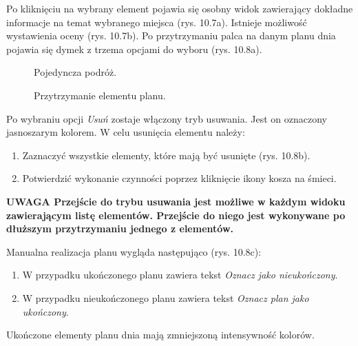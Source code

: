 \par Po kliknięciu na wybrany element pojawia się osobny widok zawierający dokładne informacje na temat wybranego miejsca (rys. 10.7a). Istnieje możliwość wystawienia oceny (rys. 10.7b).
Po przytrzymaniu palca na danym planu dnia pojawia się dymek z trzema opcjami do wyboru (rys. 10.8a).

\begin{figure}[h]

\centering
\null\hfill
{}
\hfill
{}
\hfill\null

\caption{Pojedyncza podróż.}
\label{fig:podrecznik4}
\end{figure}
\FloatBarrier

\begin{figure}[h]

\centering
\null\hfill
{}
\hfill
{}
\hfill
{}
\hfill\null

\caption{Przytrzymanie elementu planu.}
\label{fig:podrecznik5}
\end{figure}
\FloatBarrier


Po wybraniu opcji \textit{Usuń} zostaje włączony tryb usuwania.
Jest on oznaczony jasnoszarym kolorem.
W celu usunięcia elementu należy:
\begin{enumerate}
\item Zaznaczyć wszystkie elementy, które mają być usunięte (rys. 10.8b).
\item Potwierdzić wykonanie czynności poprzez kliknięcie ikony kosza na śmieci.
\end{enumerate}
\textbf{UWAGA Przejście do trybu usuwania jest możliwe w każdym widoku zawierającym listę elementów. Przejście do niego jest wykonywane po dłuższym przytrzymaniu jednego z elementów.}



\par Manualna realizacja planu wygląda następująco (rys. 10.8c):
\begin{enumerate}
\item W przypadku ukończonego planu zawiera tekst \textit{Oznacz jako nieukończony}.
\item W przypadku nieukończonego planu zawiera tekst \textit{Oznacz plan jako ukończony}.
\end{enumerate}
Ukończone elementy planu dnia mają zmniejszoną intensywność kolorów.


